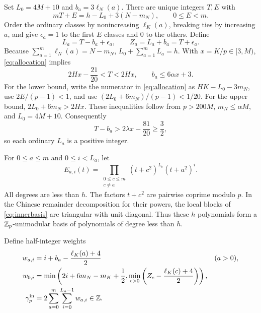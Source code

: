 Set $L_0=4M+10$ and $b_a=3\ell_N(a)$. There are unique integers $T,E$
with
\begin{equation}\label{eq:allocation}
 mT+E=h-L_0+3(N-m_N),\qquad0\le E<m.
\end{equation}
Order the ordinary classes by nonincreasing $\ell_K(a)$, breaking ties
by increasing $a$, and give $\epsilon_a=1$ to the first $E$ classes and
$0$ to the others. Define
\[
 L_a=T-b_a+\epsilon_a,\qquad Z_a=L_a+b_a=T+\epsilon_a.
\]
Because $\sum_{a=1}^m\ell_N(a)=N-m_N$,
$L_0+\sum_{a=1}^mL_a=h$. With $x=K/p\in[3,M)$, \eqref{eq:allocation}
implies
\[
 2Hx-\frac{21}{20}<T<2Hx,\qquad b_a\le6\alpha x+3.
\]
For the lower bound, write the numerator in \eqref{eq:allocation} as
$HK-L_0-3m_N$, use $2E/(p-1)<1$, and use
$(2L_0+6m_N)/(p-1)<1/20$. For the upper bound,
$2L_0+6m_N>2Hx$. These inequalities follow from $p>200M$,
$m_N\le\alpha M$, and $L_0=4M+10$. Consequently
\[
 T-b_a>2\lambda x-\frac{81}{20}\ge\frac32,
\]
so each ordinary $L_a$ is a positive integer.

For $0\le a\le m$ and $0\le i<L_a$, let
\begin{equation}\label{eq:innerbasis}
 E_{a,i}(t)=\prod_{\substack{0\le c\le m\\c\ne a}}(t+c^2)^{L_c}
                      (t+a^2)^i.
\end{equation}
All degrees are less than $h$. The factors $t+c^2$ are pairwise coprime
modulo $p$. In the Chinese remainder decomposition for their powers,
the local blocks of \eqref{eq:innerbasis} are triangular with unit
diagonal. Thus these $h$ polynomials form a $\mathbb Z_p$-unimodular basis of
polynomials of degree less than $h$.

Define half-integer weights
\begin{align}
 w_{a,i}&=i+b_a-\frac{\ell_K(a)+4}{2} &&(a>0),\label{eq:innerweights}\\
 w_{0,i}&=\min\left(2i+6m_N-m_K+\frac12,
                   \min_{c>0}\left(Z_c-\frac{\ell_K(c)+4}{2}\right)\right),
 \label{eq:zeroweights}\\
 \gamma_p^{\mathrm{in}}&=2\sum_{a=0}^m\sum_{i=0}^{L_a-1}w_{a,i}\in\mathbb Z.
 \label{eq:gammain}
\end{align}

